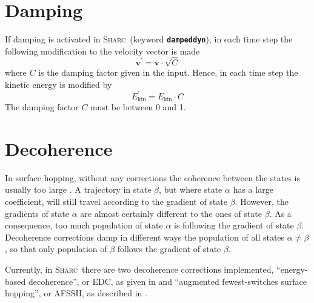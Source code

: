 \documentclass[a4paper,10pt,DIV=15,openany,twoside=false]{scrbook}
\newcommand{\sharc}{\textsc{Sharc}}
\newcommand{\ttt}[1]{\textbf{\texttt{#1}}}
\newcommand{\VEC}[1]{\ensuremath{\mathbf{#1}}}
\begin{document}

\section{Damping}\label{met:damping}

If damping is activated in \sharc\ (keyword \ttt{dampeddyn}), in each time step the following modification to the velocity vector is made
\begin{equation}
  \VEC{v}^\prime=\VEC{v}\cdot\sqrt{C}
\end{equation}
where $C$ is the damping factor given in the input. Hence, in each time step the kinetic energy is modified by
\begin{equation}
  E_{\text{kin}}^\prime=E_{\text{kin}}\cdot C
\end{equation}
The damping factor $C$ must be between 0 and 1.



% 



\section{Decoherence}\label{met:decoherence}

In surface hopping, without any corrections the coherence between the states is usually too large \cite{Granucci2007JCP}. A trajectory in state $\beta$, but where state $\alpha$ has a large coefficient, will still travel according to the gradient of state $\beta$. However, the gradients of state $\alpha$ are almost certainly different to the ones of state $\beta$. As a consequence, too much population of state $\alpha$ is following the gradient of state $\beta$. Decoherence corrections damp in different ways the population of all states $\alpha\neq\beta$, so that only population of $\beta$ follows the gradient of state $\beta$.

Currently, in \sharc\ there are two decoherence corrections implemented, ``energy-based decoherence'', or EDC, as given in \cite{Granucci2010JCP} and ``augmented fewest-switches surface hopping'', or AFSSH, as described in \cite{Subotnik_todo}.
\end{document}
